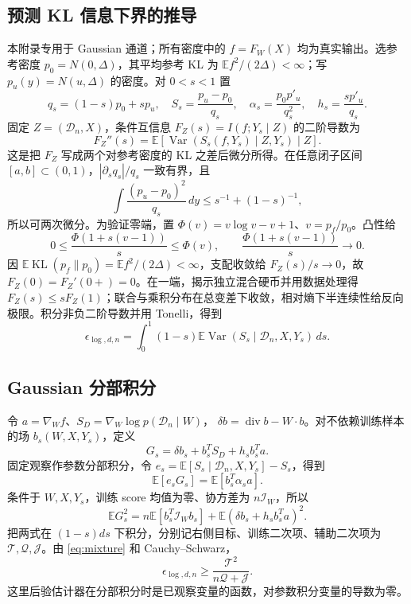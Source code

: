 \documentclass[a4paper]{tufte-handout}
\newcommand{\E}{\mathbb E}
\newcommand{\I}{\mathcal I}
\DeclareMathOperator{\KL}{KL}
\begin{document}
\begin{fullwidth}
\section{预测 KL 信息下界的推导}\label{app:information}
本附录专用于 Gaussian 通道；所有密度中的 $f=F_W(X)$ 均为真实输出。选参考密度 $p_0=N(0,\Delta)$，其平均参考 KL 为 $\E f^2/(2\Delta)<\infty$；写 $p_u(y)=N(u,\Delta)$ 的密度。对 $0<s<1$ 置
\[
q_s=(1-s)p_0+sp_u,\quad
S_s=\frac{p_u-p_0}{q_s},\quad
\alpha_s=\frac{p_0p'_u}{q_s^2},\quad h_s=\frac{sp'_u}{q_s}.
\]
固定 $Z=(\mathcal D_n,X)$，条件互信息 $F_Z(s)=I(f;Y_s\mid Z)$ 的二阶导数为
\[
F_Z''(s)=\E[\operatorname{Var}(S_s(f,Y_s)\mid Z,Y_s)\mid Z].
\]
这是把 $F_Z$ 写成两个对参考密度的 KL 之差后微分所得。在任意闭子区间 $[a,b]\subset(0,1)$，$|\partial_sq_s|/q_s$ 一致有界，且
\[
\int\frac{(p_u-p_0)^2}{q_s}\,dy\le s^{-1}+(1-s)^{-1},
\]
所以可两次微分。为验证零端，置 $\Phi(v)=v\log v-v+1$、$v=p_f/p_0$。凸性给
\[
0\le\frac{\Phi(1+s(v-1))}{s}\le\Phi(v),\qquad
\frac{\Phi(1+s(v-1))}{s}\longrightarrow0.
\]
因 $\E\KL(p_f\|p_0)=\E f^2/(2\Delta)<\infty$，支配收敛给 $F_Z(s)/s\to0$，故 $F_Z(0)=F_Z'(0+)=0$。在一端，揭示独立混合硬币并用数据处理得 $F_Z(s)\le sF_Z(1)$；联合与乘积分布在总变差下收敛，相对熵下半连续性给反向极限。积分非负二阶导数并用 Tonelli，得到
\begin{equation}\label{eq:mixture}
\epsilon_{\log,d,n}=\int_0^1(1-s)\E\operatorname{Var}(S_s\mid \mathcal D_n,X,Y_s)\,ds.
\end{equation}

\subsection{Gaussian 分部积分}
令 $a=\nabla_Wf$、$S_D=\nabla_W\log p(\mathcal D_n\mid W)$，
$\delta b=\operatorname{div}b-W\cdot b$。对不依赖训练样本的场 $b_s(W,X,Y_s)$，定义
\[
G_s=\delta b_s+b_s^TS_D+h_s b_s^Ta.
\]
固定观察作参数分部积分，令
$e_s=\E[S_s\mid \mathcal D_n,X,Y_s]-S_s$，得到
\[
\E[e_sG_s]=\E[b_s^T\alpha_sa].
\]
条件于 $W,X,Y_s$，训练 score 均值为零、协方差为 $n\I_W$，所以
\[
\E G_s^2=n\E[b_s^T\I_Wb_s]+\E(\delta b_s+h_sb_s^Ta)^2.
\]
把两式在 $(1-s)ds$ 下积分，分别记右侧目标、训练二次项、辅助二次项为 $\mathcal T,\mathcal Q,\mathcal J$。由 \eqref{eq:mixture} 和 Cauchy--Schwarz，
\begin{equation}\label{eq:tqj}
\epsilon_{\log,d,n}\ge\frac{\mathcal T^2}{n\mathcal Q+\mathcal J}.
\end{equation}
这里后验估计器在分部积分时是已观察变量的函数，对参数积分变量的导数为零。


\end{fullwidth}
\end{document}
